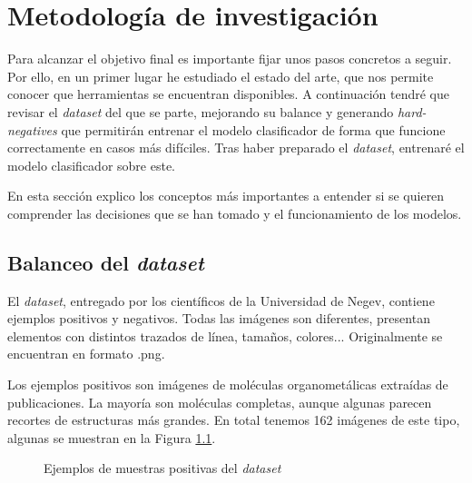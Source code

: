 \chapter{Metodología de investigación}
Para alcanzar el objetivo final es importante fijar unos pasos concretos a seguir. Por ello, en un primer lugar he estudiado el estado del arte, que nos permite conocer que herramientas se encuentran disponibles. A continuación tendré que revisar el \textit{dataset} del que se parte, mejorando su balance y generando \textit{hard-negatives} que permitirán entrenar el modelo clasificador de forma que funcione correctamente en casos más difíciles. Tras haber preparado el \textit{dataset}, entrenaré el modelo clasificador sobre este.

En esta sección explico los conceptos más importantes a entender si se quieren comprender las decisiones que se han tomado y el funcionamiento de los modelos.

\newpage
\section{Balanceo del \textit{dataset}}
El \textit{dataset}, entregado por los científicos de la Universidad de Negev, contiene ejemplos positivos y negativos. Todas las imágenes son diferentes, presentan elementos con distintos trazados de línea, tamaños, colores... Originalmente se encuentran en formato .png.

Los ejemplos positivos son imágenes de moléculas organometálicas extraídas de publicaciones. La mayoría son moléculas completas, aunque algunas parecen recortes de estructuras más grandes. En total tenemos 162 imágenes de este tipo, algunas se muestran en la Figura \ref{fig:positive_examples}.

\begin{figure}[H]
\centering
    \caption{Ejemplos de muestras positivas del \textit{dataset}}
    \label{fig:positive_examples}
\end{figure}

